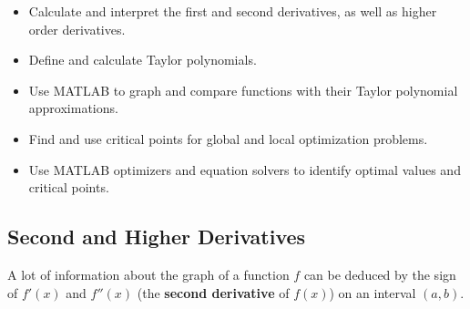 



\setfont
\pagestyle{fancy}
\renewcommand{\Week}{3 }
\renewcommand{\WeekTitle}{\WeekTitleThree }

\fancyhead[LE,RO]{Week \Week}  %
\fancyfoot{}
\sectionbox{Week \#\Week: \WeekTitle}


\vspace{5mm}
\goals
\begin{itemize}
\item Calculate and interpret the first and second derivatives, as
  well as higher order derivatives.
\item Define and calculate Taylor polynomials.
\item Use MATLAB to graph and compare functions with their Taylor
  polynomial approximations.
\item Find and use critical points for global and local optimization
  problems.
\item Use MATLAB optimizers and equation solvers to identify optimal
  values and critical points.
\end{itemize}

\vspace{5mm}


\newpage
{}
\subsection*{Second and Higher Derivatives}


A lot of information about the graph of a function $f$ can be deduced
by the sign of $f'(x)$ and $f''(x)$ (the {\bf second derivative} of
$f(x)$) on an interval $(a,b)$.

